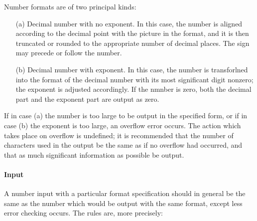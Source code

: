 \documentclass[a4paper,11pt]{article}
\begin{document}
Number formats are of two principal kinds:

\begin{enumerate}

\item[(a)] Decimal number with no exponent.  In this case, the number
  is aligned according to the decimal point with the picture in the
  format, and it is then truncated or rounded to the appropriate
  number of decimal places.  The sign may precede or follow the
  number.

\item[(b)] Decimal number with exponent.  In this case, the number is
  transforlned into the format of the decimal number with its most
  significant digit nonzero; the exponent is adjusted accordingly.  If
  the nmnber is zero, both the decimal part and the exponent part are
  output as zero.

\end{enumerate}

If in case (a) the number is too large to be output in the specified
form, or if in case (b) the exponent is too large, an overflow error
occurs.  The action which takes place on overflow is undefined; it is
recommended that the number of characters used in the output be the
same as if no overflow had occurred, and that as much significant
information as possible be output.

\paragraph{Input}
\label{Lbl++Formats+Number+Semantics+Input}

A number input with a particular format specification should in
general be the same as the number which would be output with the same
format, except less error checking occurs. The rules are, more
precisely:
\end{document}
